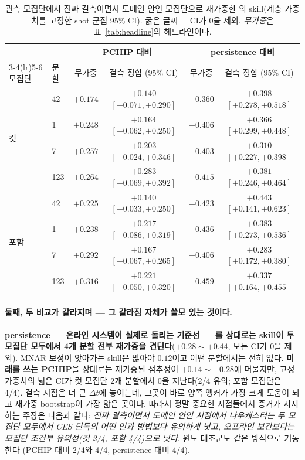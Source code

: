 \documentclass[10pt,a4paper]{article}
\begin{document}
\begin{table}[t]
  \centering
  \caption{관측 모집단에서 진짜 결측이면서 도메인 안인 모집단으로 재가중한
  \seqv{}의 \Ti{} skill(계층 가중치를 고정한 shot 군집 95\% CI). 굵은 글씨 =
  CI가 0을 제외. \emph{무가중}은 표~\ref{tab:headline}의 헤드라인이다.}
  \label{tab:mnar}
  \small
  \begin{tabular}{llcccc}
    \toprule
    & & \multicolumn{2}{c}{PCHIP 대비} & \multicolumn{2}{c}{persistence 대비} \\
    \cmidrule(lr){3-4}\cmidrule(lr){5-6}
    모집단 & 분할 & 무가중 & 결측 정합 (95\% CI) & 무가중 & 결측 정합 (95\% CI) \\
    \midrule
    \multirow{4}{*}{컷}
      & 42  & $+0.174$ & $+0.140$ $[-0.071, +0.290]$ & $+0.360$ & $\mathbf{+0.398}$ $[+0.278, +0.518]$ \\
      & 1   & $+0.248$ & $\mathbf{+0.164}$ $[+0.062, +0.250]$ & $+0.406$ & $\mathbf{+0.366}$ $[+0.299, +0.448]$ \\
      & 7   & $+0.257$ & $+0.203$ $[-0.024, +0.346]$ & $+0.403$ & $\mathbf{+0.310}$ $[+0.227, +0.398]$ \\
      & 123 & $+0.264$ & $\mathbf{+0.283}$ $[+0.069, +0.392]$ & $+0.415$ & $\mathbf{+0.381}$ $[+0.246, +0.464]$ \\
    \midrule
    \multirow{4}{*}{포함}
      & 42  & $+0.225$ & $\mathbf{+0.140}$ $[+0.033, +0.250]$ & $+0.423$ & $\mathbf{+0.443}$ $[+0.141, +0.623]$ \\
      & 1   & $+0.238$ & $\mathbf{+0.217}$ $[+0.086, +0.319]$ & $+0.436$ & $\mathbf{+0.383}$ $[+0.273, +0.536]$ \\
      & 7   & $+0.292$ & $\mathbf{+0.167}$ $[+0.067, +0.265]$ & $+0.406$ & $\mathbf{+0.283}$ $[+0.172, +0.380]$ \\
      & 123 & $+0.316$ & $\mathbf{+0.221}$ $[+0.050, +0.320]$ & $+0.459$ & $\mathbf{+0.337}$ $[+0.164, +0.455]$ \\
    \bottomrule
  \end{tabular}
\end{table}

\paragraph{둘째, 두 비교가 갈라지며 --- 그 갈라짐 자체가 쓸모 있는 것이다.}
\textbf{persistence --- 온라인 시스템이 실제로 돌리는 기준선 --- 를 상대로는 \Ti{}
skill이 두 모집단 모두에서 4개 분할 전부 재가중을 견딘다}($+0.28\sim+0.44$, 모든
CI가 0을 제외). MNAR 보정이 앗아가는 skill은 많아야 $0.12$이고 어떤 분할에서는
전혀 없다. \textbf{미래를 쓰는 PCHIP}을 상대로는 재가중된 점추정이
$+0.14\sim+0.28$에 머물지만, 고정 가중치의 넓은 CI가 컷 모집단 2개 분할에서 0을
지난다(2/4 유의; 포함 모집단은 4/4). 결측 지점은 더 큰 $\Delta t$에 놓이는데,
그곳이 바로 양쪽 앵커가 가장 크게 도움이 되고 재가중 bootstrap이 가장 얇은
곳이다. 따라서 정말 중요한 지점들에서 증거가 지지하는 주장은 다음과 같다:
\emph{진짜 결측이면서 도메인 안인 시점에서 나우캐스터는 두 모집단 모두에서 CES
단독의 어떤 인과 방법보다 유의하게 낫고, 오프라인 보간보다는 모집단 조건부
유의성(컷 2/4, 포함 4/4)으로 낫다}. 윈도 대조군도 같은 방식으로 거동한다
(PCHIP 대비 2/4와 4/4, persistence 대비 4/4).
\end{document}
